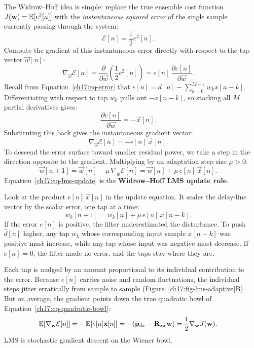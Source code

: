 The Widrow--Hoff idea is simple: replace the true ensemble cost function $J(\mathbf{w}) = \operatorname{\mathbb{E}}[e^2[n]]$ with the \emph{instantaneous squared error} of the single sample currently passing through the system:
\begin{equation}
  \mathcal{E}[n] = \frac{1}{2} e^2[n] .
  \label{ch17:eq-instantaneous-error}
\end{equation}
Compute the gradient of this instantaneous error directly with respect to the tap vector $\vec{w}[n]$:
\begin{equation}
  \nabla_{\vec{w}} \mathcal{E}[n] = \frac{\partial}{\partial \vec{w}} \left( \frac{1}{2} e^2[n] \right) = e[n]\, \frac{\partial e[n]}{\partial \vec{w}} .
  \label{ch17:eq-chain-rule}
\end{equation}
Recall from Equation~\eqref{ch17:eq-error} that $e[n] = d[n] - \sum_{k=0}^{M-1} w_k x[n-k]$. Differentiating with respect to tap $w_k$ pulls out $-x[n-k]$, so stacking all $M$ partial derivatives gives:
\begin{equation}
  \frac{\partial e[n]}{\partial \vec{w}} = -\vec{x}[n] .
  \label{ch17:eq-grad-e}
\end{equation}
Substituting this back gives the instantaneous gradient vector:
\begin{equation}
  \nabla_{\vec{w}} \mathcal{E}[n] = -e[n]\, \vec{x}[n] .
  \label{ch17:eq-instant-grad}
\end{equation}
To descend the error surface toward smaller residual power, we take a step in the direction opposite to the gradient. Multiplying by an adaptation step size $\mu > 0$:
\begin{equation}
  \vec{w}[n+1] = \vec{w}[n] - \mu\, \nabla_{\vec{w}} \mathcal{E}[n] = \vec{w}[n] + \mu\, e[n]\, \vec{x}[n] .
  \label{ch17:eq-lms-update}
\end{equation}
Equation~\eqref{ch17:eq-lms-update} is the \textbf{Widrow--Hoff LMS update rule}.

\begin{intuitionbox}
Look at the product $e[n]\, \vec{x}[n]$ in the update equation. It scales the delay-line vector by the scalar error, one tap at a time:
\[
  w_k[n+1] = w_k[n] + \mu\, e[n]\, x[n-k] .
\]
If the error $e[n]$ is positive, the filter underestimated the disturbance. To push $\hat{d}[n]$ higher, any tap $w_k$ whose corresponding input sample $x[n-k]$ was positive must increase, while any tap whose input was negative must decrease. If $e[n] = 0$, the filter made no error, and the taps stay where they are. 

Each tap is nudged by an amount proportional to its individual contribution to the error. Because $e[n]$ carries noise and random fluctuations, the individual steps jitter erratically from sample to sample (Figure~\ref{ch17:fig-lms-adaptive}B). But on average, the gradient points down the true quadratic bowl of Equation~\eqref{ch17:eq-quadratic-bowl}:
\[
  \operatorname{\mathbb{E}}[\nabla_{\mathbf{w}}\mathcal{E}[n]] = -\operatorname{\mathbb{E}}[e[n]\mathbf{x}[n]] = -(\mathbf{p}_{dx} - \mathbf{R}_{xx}\mathbf{w}) = \frac{1}{2}\nabla_{\mathbf{w}}J(\mathbf{w}) .
\]
LMS is stochastic gradient descent on the Wiener bowl.
\end{intuitionbox}


